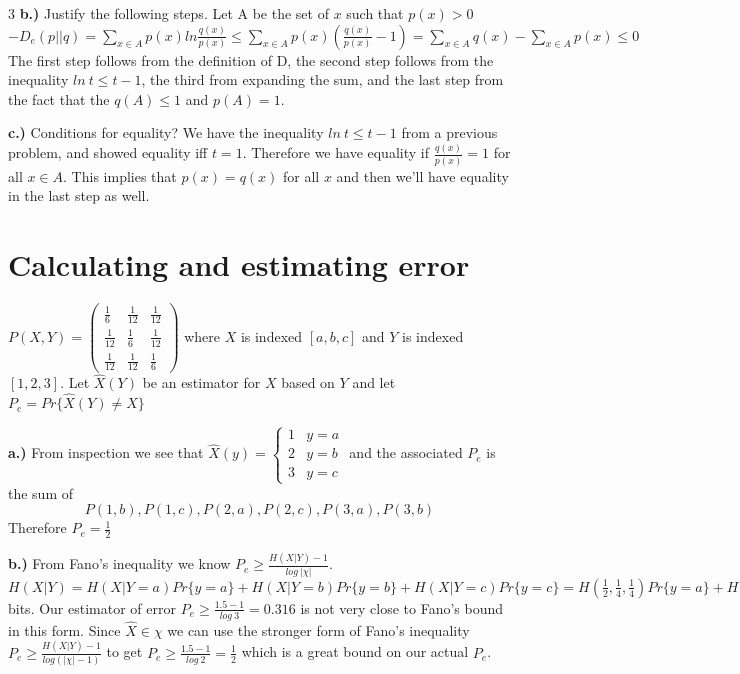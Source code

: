 \documentclass[10pt]{article}
\begin{document}
\begin{tiny}
\begin{multicols}{3}
			{\bf b.)} Justify the following steps. 
				Let A be the set of $x$ such that $p(x) > 0$
				\(
				-D_e(p||q)=\sum_{x\in A} p(x) ln \frac{q(x)}{p(x)}
				\leq \sum_{x\in A} p(x)\left( \frac{q(x)}{p(x)}-1\right)
				=\sum_{x\in A} q(x) - \sum_{x\in A} p(x)
				\leq 0
				\)
				The first step follows from the definition of D, the second step follows from the inequality $ln\ t \leq t - 1$, the third from expanding the sum, and the last step from the fact that the $q(A) \leq 1$ and $p(A)=1$.
				
			{\bf c.)} Conditions for equality?
			We have the inequality $ln\ t \leq t-1$ from a previous problem, and showed equality iff $t=1$. Therefore we have equality if $\frac{q(x)}{p(x)}=1$ for all $x\in A$. This implies that $p(x)=q(x)$ for all $x$ and then we'll have equality in the last step as well. 	
          
\section*{Calculating and estimating error}
        \(P(X,Y) = \left( \begin{array}{ccc}
\frac{1}{6} & \frac{1}{12} & \frac{1}{12} \\
\frac{1}{12} & \frac{1}{6} & \frac{1}{12} \\
\frac{1}{12} & \frac{1}{12} & \frac{1}{6} \end{array} \right)\)
 where $X$ is indexed $[a,b,c]$ and $Y$ is indexed $[1,2,3]$. Let $\hat{X}(Y)$  be an estimator for $X$ based on $Y$ and let $P_e=Pr\{\hat{X}(Y)\neq X\}$

        {\bf a.)}
        	From inspection we see that 
        	\(\hat{X}(y)=\left\{ \begin{array}{cc}
        		1 & y=a\\
        		2 & y=b\\
        		3 & y=c \end{array}\right. \)
	and the associated $P_e$ is the sum of 
	\[
	P(1,b),  P(1,c), P(2,a),
	 P(2,c), P(3,a), P(3,b) \] Therefore $P_e=\frac{1}{2}$
        
        {\bf b.)}
        	From Fano's inequality we know \(P_e \geq \frac{H(X|Y)-1}{log\ |\chi|}\). \(
        	H(X|Y)= H(X|Y=a)Pr\{y=a\}+H(X|Y=b)Pr\{y=b\}+H(X|Y=c)Pr\{y=c\}
        	=H\left(\frac{1}{2},\frac{1}{4},\frac{1}{4}\right)Pr\{y=a\}+H\left(\frac{1}{2},\frac{1}{4},\frac{1}{4}\right)Pr\{y=b\}+H\left(\frac{1}{2},\frac{1}{4},\frac{1}{4}\right)Pr\{y=c\}
        	=H\left(\frac{1}{2},\frac{1}{4},\frac{1}{4}\right)\left( Pr\{y=a\}+Pr\{y=b\}+Pr\{y=c\}\right)
        	=H\left(\frac{1}{2},\frac{1}{4},\frac{1}{4}\right)
        	=1.5
        	\) bits. 
        	Our estimator of error $P_e\geq \frac{1.5-1}{log\ 3}=0.316$ is not very close to Fano's bound in this form. Since $\hat{X}\in \chi$ we can use the stronger form of Fano's inequality 
        	\( P_e \geq \frac{H(X|Y)-1}{log(|\chi|-1)}  \) to get \( P_e \geq \frac{1.5-1}{log\ 2}=\frac{1}{2} \) which is a great bound on our actual $P_e$.


\end{multicols}
\end{tiny}
\end{document}
